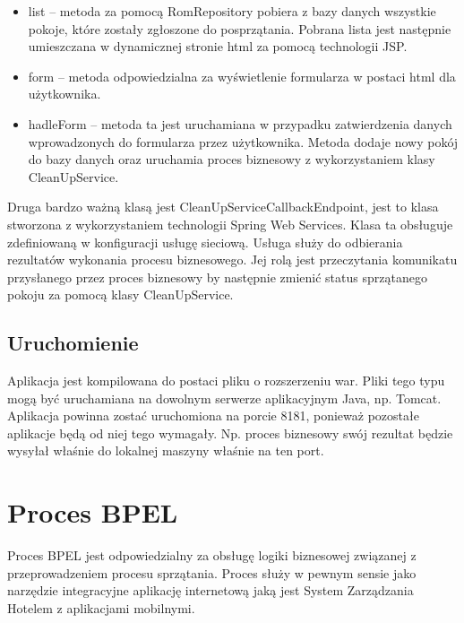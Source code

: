 \begin{itemize}
\item list -- metoda za pomocą RomRepository pobiera z bazy danych wszystkie pokoje, które zostały zgłoszone do posprzątania. Pobrana lista jest  następnie umieszczana w dynamicznej stronie html za pomocą technologii JSP. 
\item form -- metoda odpowiedzialna za wyświetlenie formularza w postaci html dla użytkownika. 
\item hadleForm -- metoda ta jest uruchamiana w przypadku zatwierdzenia danych wprowadzonych do formularza przez użytkownika. Metoda dodaje nowy pokój do bazy danych oraz uruchamia proces biznesowy z wykorzystaniem klasy CleanUpService. 
\end{itemize}

Druga bardzo ważną klasą jest CleanUpServiceCallbackEndpoint, jest to klasa stworzona z wykorzystaniem technologii Spring Web Services. Klasa ta obsługuje zdefiniowaną w konfiguracji usługę sieciową. Usługa służy do odbierania rezultatów wykonania procesu biznesowego. Jej rolą jest przeczytania komunikatu przysłanego przez proces biznesowy by następnie zmienić status sprzątanego pokoju za pomocą klasy CleanUpService. 

\subsection{Uruchomienie}

Aplikacja jest kompilowana do postaci pliku o rozszerzeniu war. Pliki tego typu mogą być uruchamiana na dowolnym serwerze aplikacyjnym Java, np. Tomcat. Aplikacja powinna zostać uruchomiona na porcie 8181, ponieważ pozostałe aplikacje będą od niej tego wymagały. Np. proces biznesowy swój rezultat będzie wysyłał właśnie do lokalnej maszyny właśnie na ten port. 


\section{Proces BPEL }
\label{sec:exampleBPEL}

Proces BPEL jest odpowiedzialny za obsługę logiki biznesowej związanej z przeprowadzeniem procesu sprzątania. Proces służy w pewnym sensie jako narzędzie integracyjne aplikację internetową jaką jest System Zarządzania Hotelem z aplikacjami mobilnymi. 

